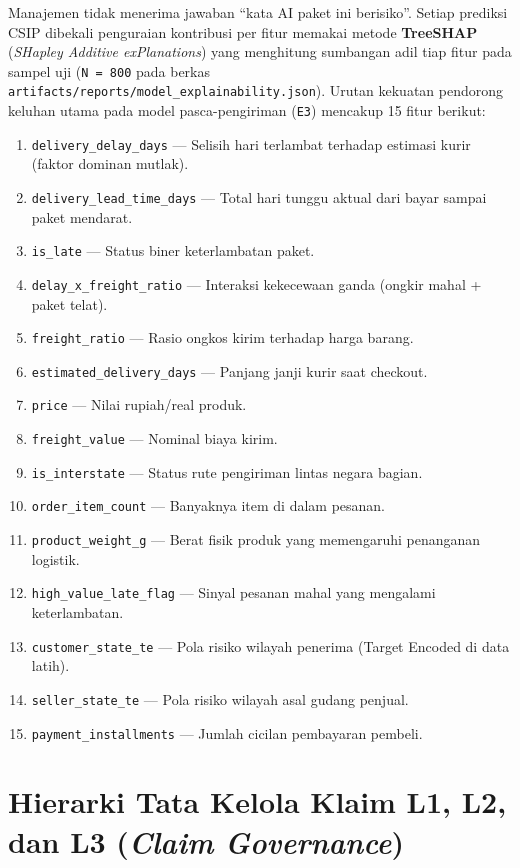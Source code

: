 \documentclass[11pt,a4paper,oneside]{book}
\newcommand{\code}[1]{{\small\nolinkurl{#1}}}
\begin{document}
Manajemen tidak menerima jawaban ``kata AI paket ini berisiko''. Setiap prediksi CSIP dibekali penguraian kontribusi per fitur memakai metode \textbf{TreeSHAP} (\emph{SHapley Additive exPlanations}) yang menghitung sumbangan adil tiap fitur pada sampel uji (\code{N = 800} pada berkas \code{artifacts/reports/model_explainability.json}). Urutan kekuatan pendorong keluhan utama pada model pasca-pengiriman (\code{E3}) mencakup 15 fitur berikut:
\begin{enumerate}
  \item \code{delivery_delay_days} --- Selisih hari terlambat terhadap estimasi kurir (faktor dominan mutlak).
  \item \code{delivery_lead_time_days} --- Total hari tunggu aktual dari bayar sampai paket mendarat.
  \item \code{is_late} --- Status biner keterlambatan paket.
  \item \code{delay_x_freight_ratio} --- Interaksi kekecewaan ganda (ongkir mahal + paket telat).
  \item \code{freight_ratio} --- Rasio ongkos kirim terhadap harga barang.
  \item \code{estimated_delivery_days} --- Panjang janji kurir saat checkout.
  \item \code{price} --- Nilai rupiah/real produk.
  \item \code{freight_value} --- Nominal biaya kirim.
  \item \code{is_interstate} --- Status rute pengiriman lintas negara bagian.
  \item \code{order_item_count} --- Banyaknya item di dalam pesanan.
  \item \code{product_weight_g} --- Berat fisik produk yang memengaruhi penanganan logistik.
  \item \code{high_value_late_flag} --- Sinyal pesanan mahal yang mengalami keterlambatan.
  \item \code{customer_state_te} --- Pola risiko wilayah penerima (Target Encoded di data latih).
  \item \code{seller_state_te} --- Pola risiko wilayah asal gudang penjual.
  \item \code{payment_installments} --- Jumlah cicilan pembayaran pembeli.
\end{enumerate}

\section{Hierarki Tata Kelola Klaim L1, L2, dan L3 (\emph{Claim Governance})}
\end{document}
